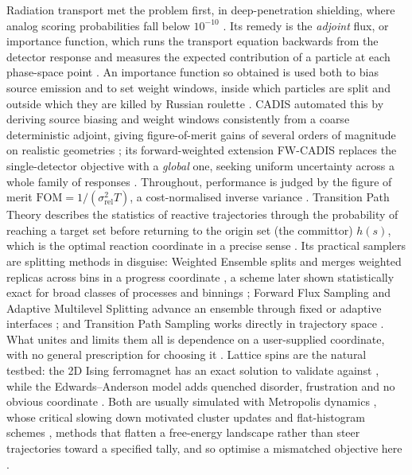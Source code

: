 \documentclass[a4paper,fleqn]{cas-sc}
\begin{document}
Radiation transport met the problem first, in deep-penetration shielding, where analog
scoring probabilities fall below $10^{-10}$ \cite{spanier1969, wagner1998}. Its remedy is
the \emph{adjoint} flux, or importance function, which runs the transport equation
backwards from the detector response and measures the expected contribution of a particle
at each phase-space point \cite{lewins1965, bell1970}. An importance function so obtained
is used both to bias source emission and to set weight windows, inside which particles are
split and outside which they are killed by Russian roulette \cite{kahn1951, booth1984}.
CADIS automated this by deriving source biasing and weight windows consistently from a
coarse deterministic adjoint, giving figure-of-merit gains of several orders of magnitude
on realistic geometries \cite{wagner1998, haghighat2003}; its forward-weighted extension
FW-CADIS replaces the single-detector objective with a \emph{global} one, seeking uniform
uncertainty across a whole family of responses \cite{wagnerfw2014, cooper2001}.
Throughout, performance is judged by the figure of merit
$\mathrm{FOM}=1/(\sigma_{\mathrm{rel}}^{2}T)$, a cost-normalised inverse variance
\cite{spanier1969, wagnerfw2014}.
Transition Path Theory describes the statistics of reactive trajectories through the probability of reaching a target set before returning to the origin set (the committor)	$h(s)$, which
is the optimal reaction coordinate in a precise sense \cite{e2006, metzner2009,
	evanden2010}. Its practical samplers are splitting methods in disguise: Weighted Ensemble
splits and merges weighted replicas across bins in a progress coordinate \cite{huber1996},
a scheme later shown statistically exact for broad classes of processes and binnings
\cite{zhang2010}; Forward Flux Sampling and Adaptive Multilevel Splitting advance an
ensemble through fixed or adaptive interfaces \cite{allen2009, cerou2007}; and Transition
Path Sampling works directly in trajectory space \cite{bolhuis2002}. What unites and
limits them all is dependence on a user-supplied coordinate, with no general prescription
for choosing it \cite{zuckerman2017, allen2009}. Lattice spins are the natural testbed:
the 2D Ising ferromagnet \cite{ising1925} has an exact solution to validate against
\cite{onsager1944}, while the Edwards--Anderson model adds quenched disorder, frustration
and no obvious coordinate \cite{edwards1975, binder1986}. Both are usually simulated with
Metropolis dynamics \cite{metropolis1953}, whose critical slowing down motivated cluster
updates \cite{swendsen1987, wolff1989} and flat-histogram schemes \cite{berg1992,
	wanglandau2001}, methods that flatten a free-energy landscape rather than steer
trajectories toward a specified tally, and so optimise a mismatched objective here
\cite{wanglandau2001}.
\end{document}
